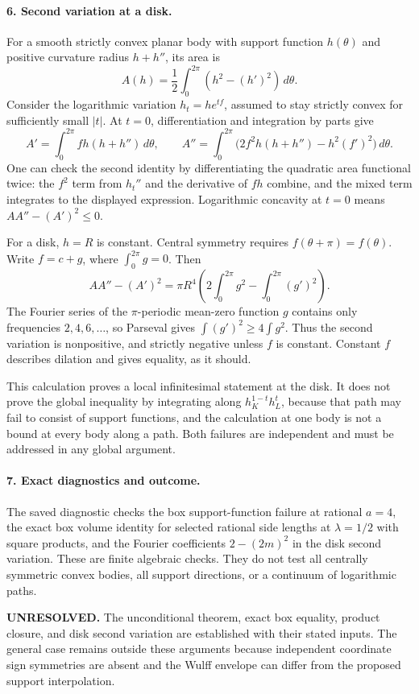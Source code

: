 \documentclass[11pt]{article}
\begin{document}
\paragraph{6. Second variation at a disk.}
For a smooth strictly convex planar body with support function $h(\theta)$ and positive curvature radius $h+h''$, its area is
\[
 A(h)=\frac12\int_0^{2\pi}(h^2-(h')^2)\,d\theta.
\]
Consider the logarithmic variation $h_t=h e^{tf}$, assumed to stay strictly convex for sufficiently small $|t|$. At $t=0$, differentiation and integration by parts give
\[
 A'=\int_0^{2\pi} f h(h+h'')\,d\theta,
 \qquad
 A''=\int_0^{2\pi}\bigl(2f^2h(h+h'')-h^2(f')^2\bigr)\,d\theta.
\]
One can check the second identity by differentiating the quadratic area functional twice: the $f^2$ term from $h_t''$ and the derivative of $fh$ combine, and the mixed term integrates to the displayed expression. Logarithmic concavity at $t=0$ means $AA''-(A')^2\leq0$.

For a disk, $h=R$ is constant. Central symmetry requires $f(\theta+\pi)=f(\theta)$. Write $f=c+g$, where $\int_0^{2\pi}g=0$. Then
\[
 AA''-(A')^2
 =\pi R^4\left(2\int_0^{2\pi}g^2-\int_0^{2\pi}(g')^2\right).
\]
The Fourier series of the $\pi$-periodic mean-zero function $g$ contains only frequencies $2,4,6,\ldots$, so Parseval gives $\int(g')^2\geq4\int g^2$. Thus the second variation is nonpositive, and strictly negative unless $f$ is constant. Constant $f$ describes dilation and gives equality, as it should.

This calculation proves a local infinitesimal statement at the disk. It does not prove the global inequality by integrating along $h_K^{1-t}h_L^t$, because that path may fail to consist of support functions, and the calculation at one body is not a bound at every body along a path. Both failures are independent and must be addressed in any global argument.

\paragraph{7. Exact diagnostics and outcome.}
The saved diagnostic checks the box support-function failure at rational $a=4$, the exact box volume identity for selected rational side lengths at $\lambda=1/2$ with square products, and the Fourier coefficients $2-(2m)^2$ in the disk second variation. These are finite algebraic checks. They do not test all centrally symmetric convex bodies, all support directions, or a continuum of logarithmic paths.

\textbf{UNRESOLVED.} The unconditional theorem, exact box equality, product closure, and disk second variation are established with their stated inputs. The general case remains outside these arguments because independent coordinate sign symmetries are absent and the Wulff envelope can differ from the proposed support interpolation.
\end{document}
